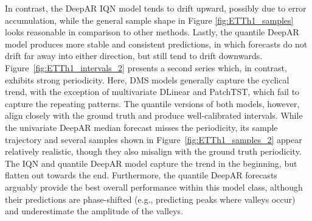 \documentclass[a4paper,oneside,bibliography=totoc]{scrbook}
\begin{document}
In contrast, the DeepAR IQN model tends to drift upward, possibly due to error accumulation, while the general sample shape in Figure \ref{fig:ETTh1_samples} looks reasonable in comparison to other methods.
Lastly, the quantile DeepAR model produces more stable and consistent predictions, in which forecasts do not drift far away into either direction, but still tend to drift downwards.
Figure~\ref{fig:ETTh1_intervals_2} presents a second series which, in contrast, exhibits strong periodicity. Here, DMS models generally capture the cyclical trend, with the exception of multivariate DLinear and PatchTST, which fail to capture the repeating patterns.
The quantile versions of both models, however, align closely with the ground truth and produce well-calibrated intervals.
While the univariate DeepAR median forecast misses the periodicity, its sample trajectory and several samples shown in Figure~\ref{fig:ETTh1_samples_2} appear relatively realistic, though they also misalign with the ground truth periodicity. 
The IQN and quantile DeepAR model capture the trend in the beginning, but flatten out towards the end.
Furthermore, the quantile DeepAR forecasts arguably provide the best overall performance within this model class, although their predictions are phase-shifted (e.g., predicting peaks where valleys occur) and underestimate the amplitude of the valleys.
\end{document}
